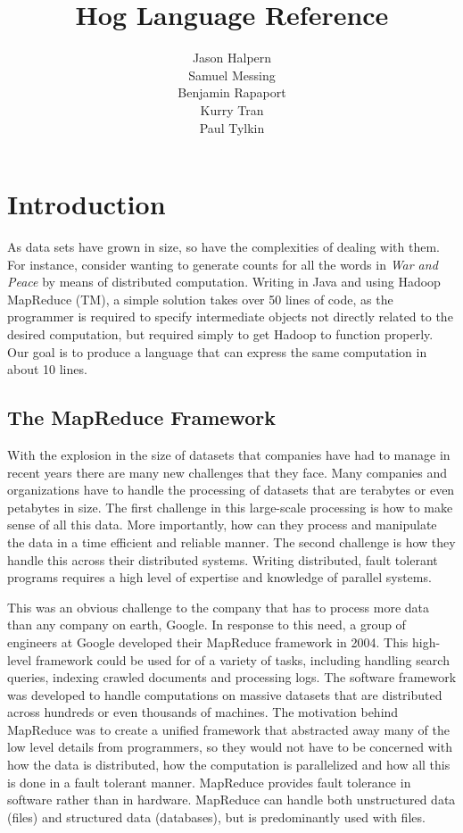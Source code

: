 \documentclass{article}
\title{\huge \textbf{Hog Language Reference}}
\author{Jason Halpern\\ Samuel Messing\\ 
        Benjamin Rapaport \\  Kurry Tran \\ Paul Tylkin}
\begin{document}
\maketitle
\newpage

\section{Introduction}
\label{sec:introduction}

As data sets have grown in size, so have the complexities of dealing with them.
For instance, consider wanting to generate counts for all the words in \emph{War
and Peace} by means of distributed computation. Writing in Java and using Hadoop
MapReduce (TM), a simple solution takes over 50 lines of code, as the programmer
is required to specify intermediate objects not directly related to the desired
computation, but required simply to get Hadoop to function properly. Our goal is
to produce a language that can express the same computation in about 10 lines.

\subsection{The MapReduce Framework}
\label{sub:mapreduce}

With the explosion in the size of datasets that companies have had to manage in
recent years there are many new challenges that they face. Many companies and
organizations have to handle the processing of datasets that are terabytes or even
petabytes in size. The first challenge in this large-scale processing is how to
make sense of all this data. More importantly, how can they process and manipulate
the data in a time efficient and reliable manner. The second challenge is how they
handle this across their distributed systems. Writing distributed, fault tolerant
programs requires a high level of expertise and knowledge of parallel systems.

This was an obvious challenge to the company that has to process more data than any
company on earth, Google. In response to this need, a group of engineers at Google
developed their MapReduce framework in 2004. This high-level framework could be
used for of a variety of tasks, including handling search queries, indexing crawled
documents and processing logs. The software framework was developed to handle
computations on massive datasets that are distributed across hundreds or even
thousands of machines. The motivation behind MapReduce was to create a unified
framework that abstracted away many of the low level details from programmers, so
they would not have to be concerned with how the data is distributed, how the
computation is parallelized and how all this is done in a fault tolerant manner.
MapReduce provides fault tolerance in software rather than in hardware. MapReduce
can handle both unstructured data (files) and structured data (databases), but is
predominantly used with files.
\end{document}
